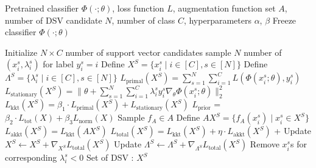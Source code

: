 \begin{algorithm*}[h]
\caption{Support Vector Refinement for Deep Learning Model }\label{alg:KKT}
\begin{algorithmic}[1]
\Require Pretrained classifier $\Phi(\cdot; \theta)$, loss function $L$, augmentation function set $A$, number of DSV candidate $N$, number of class  $C$, hyperparameters $\alpha$, $\beta$
\Ensure Freeze classifier $\Phi(\cdot; \theta)$

\State Initialize $N \times C$ number of support vector candidates
    \State sample $N$ number of $(x^s_i, \lambda^s_i)$ for label $y^s_i = i$
\EndFor
\State Define $X^S = \{ x^s_i \mid i \in [C], s \in [N]\}$
\State Define $\Lambda^S = \{ \lambda^s_i \mid i \in [C], s \in [N]\}$
\Repeat
    \State $L_{\text{primal}}(X^S) = \sum_{s=1}^{N} \sum_{i=1}^{C} L(\Phi(x^s_i;\theta), y^s_i)$
    \State $L_{\text{stationary}}(X^S) = \|\theta + \sum_{s=1}^{N} \sum_{i=1}^{C} \lambda^s_i y^s_i \nabla_\theta \Phi(x^s_i;\theta)\|^2_2$
    \State $L_{\text{kkt}}(X^S) = \beta_1 \cdot L_{\text{primal}}(X^S) +  L_{\text{stationary}}(X^S)$
    \State $L_{\text{prior}}$ = $\beta_2 \cdot L_{\text{tot}}(X) + \beta_3 L_{\text{norm}}(X)$
    \State Sample $f_A \in A$
    \State Define $AX^S = \{ f_A(x^s_i) \mid x^s_i \in X^S\}$
    \State $L_{\text{akkt}}(X^S) = L_{\text{kkt}}(AX^S)$  
    \State $L_{\text{total}}(X^S) = L_{\text{kkt}}(X^S) + \eta \cdot L_{\text{akkt}}(X^S)$ + 
    \State Update $X^S \leftarrow X^S + \nabla_{X^S} L_{\text{total}}(X^S)$
    \State Update $\Lambda^S \leftarrow \Lambda^S + \nabla_{\Lambda^S} L_{\text{total}}(X^S)$
    \State Remove $x^s_i$s for corresponding $\lambda^s_i < 0$
\State \Return Set of DSV : $X^S$
\end{algorithmic}
\end{algorithm*}





